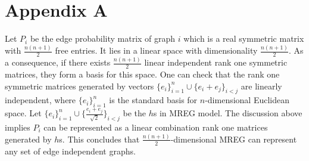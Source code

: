 \documentclass[10pt,journal,compsoc]{IEEEtran}
\newenvironment{proof}[1][Proof]{\begin{trivlist}
		\item[\hskip \labelsep {\bfseries #1}]}{\end{trivlist}}
\begin{document}
\section*{Appendix A}

\begin{proof} [Proof of Theorem 2.1]
 Let $P_i$ be the edge probability matrix of graph $i$ which is a real symmetric matrix with $\frac{n(n+1)}{2}$ free entries. It lies in a linear space with dimensionality $\frac{n(n+1)}{2}$. As a consequence, if there exists $\frac{n(n+1)}{2}$ linear independent rank one symmetric matrices, they form a basis for this space. One can check that the rank one symmetric matrices generated by vectors $\{e_i\}_{i=1}^{n} \cup \{e_i+e_j\}_{i<j}$ are linearly independent, where $\{e_i\}_{i=1}^{n}$ is the standard basis for $n$-dimensional Euclidean space. Let $\{e_i\}_{i=1}^{n} \cup \{\frac{e_i+e_j}{\sqrt{2}}\}_{i<j}$ be the $h$s in MREG model. The discussion above implies $P_i$ can be represented as a linear combination rank one matrices generated by $h$s. This concludes that $\frac{n(n+1)}{2}$-dimensional MREG can represent any set of edge independent graphs. 
\end{proof}
\end{document}
